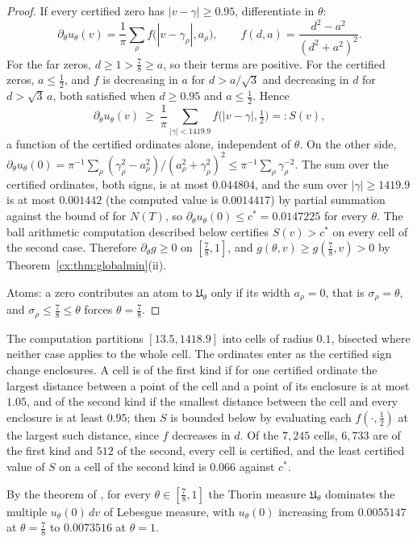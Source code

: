\begin{proof}
If every certified zero has $|v-\gamma|\ge0.95$, differentiate in $\theta$:
\[
\partial_\theta u_\theta(v)=\frac1\pi\sum_\rho f\bigl(|v-\gamma_\rho|,a_\rho\bigr),\qquad f(d,a)=\frac{d^2-a^2}{(d^2+a^2)^2}.
\]
For the far zeros, $d\ge1>\tfrac78\ge a$, so their terms are positive. For the certified zeros, $a\le\tfrac12$, and $f$ is decreasing in $a$ for $d>a/\sqrt3$ and decreasing in $d$ for $d>\sqrt3\,a$, both satisfied when $d\ge0.95$ and $a\le\tfrac12$. Hence
\[
\partial_\theta u_\theta(v)\ \ge\ \frac1\pi\sum_{|\gamma|<1419.9}f\bigl(|v-\gamma|,\tfrac12\bigr)=:S(v),
\]
a function of the certified ordinates alone, independent of $\theta$. On the other side, $\partial_\theta u_\theta(0)=\pi^{-1}\sum_\rho(\gamma_\rho^2-a_\rho^2)/(a_\rho^2+\gamma_\rho^2)^2\le\pi^{-1}\sum_\rho\gamma_\rho^{-2}$. The sum over the certified ordinates, both signs, is at most $0.044804$, and the sum over $|\gamma|\ge1419.9$ is at most $0.001442$ (the computed value is $0.0014417$) by partial summation against the bound of \cite{HSW22} for $N(T)$, so $\partial_\theta u_\theta(0)\le c^*=0.0147225$ for every $\theta$. The ball arithmetic computation described below certifies $S(v)>c^*$ on every cell of the second case. Therefore $\partial_\theta g\ge0$ on $[\tfrac78,1]$, and $g(\theta,v)\ge g(\tfrac78,v)>0$ by Theorem~\ref{cx:thm:globalmin}(ii).

Atoms: a zero contributes an atom to $\mathfrak U_\theta$ only if its width $a_\rho=0$, that is $\sigma_\rho=\theta$, and $\sigma_\rho\le\tfrac78\le\theta$ forces $\theta=\tfrac78$.
\end{proof}

The computation partitions $[13.5,1418.9]$ into cells of radius $0.1$, bisected where neither case applies to the whole cell. The ordinates enter as the certified sign change enclosures. A cell is of the first kind if for one certified ordinate the largest distance between a point of the cell and a point of its enclosure is at most $1.05$, and of the second kind if the smallest distance between the cell and every enclosure is at least $0.95$; then $S$ is bounded below by evaluating each $f(\cdot,\tfrac12)$ at the largest such distance, since $f$ decreases in $d$. Of the $7{,}245$ cells, $6{,}733$ are of the first kind and $512$ of the second, every cell is certified, and the least certified value of $S$ on a cell of the second kind is $0.066$ against $c^*$.

\begin{corollary}\label{cx:cor:uniform}
By the theorem of \cite{OAI26a}, for every $\theta\in[\tfrac78,1]$ the Thorin measure $\mathfrak U_\theta$ dominates the multiple $u_\theta(0)\,dv$ of Lebesgue measure, with $u_\theta(0)$ increasing from $0.0055147$ at $\theta=\tfrac78$ to $0.0073516$ at $\theta=1$.
\end{corollary}

